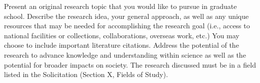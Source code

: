 \documentclass[12pt]{article}
\begin{document}
Present an original research topic that you would like to pursue in graduate school. Describe the research idea, your general approach, as well as any unique resources that may be needed for accomplishing the research goal (i.e., access to national facilities or collections, collaborations, overseas work, etc.) You may choose to include important literature citations. Address the potential of the research to advance knowledge and understanding within science as well as the potential for broader impacts on society. The research discussed must be in a field listed in the Solicitation (Section X, Fields of Study).
\end{document}
